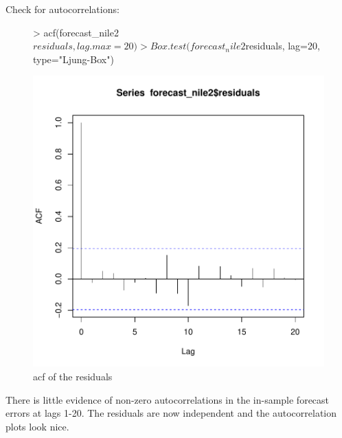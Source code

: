 \documentclass[10pt, a4paper]{article} %
\begin{document}
Check for autocorrelations:
\begin{figure}[H]
\centering
\begin{Schunk}
\begin{Sinput}
> acf(forecast_nile2$residuals, lag.max = 20)
> Box.test(forecast_nile2$residuals, lag=20, type="Ljung-Box")
\end{Sinput}
\end{Schunk}
\includegraphics{FINAL_VERSION-098}
\caption{acf of the residuals}
\end{figure}
\noindent There is little evidence of non-zero autocorrelations in the in-sample forecast errors at lags 1-20. The residuals are now independent and the autocorrelation plots look nice.
\end{document}
